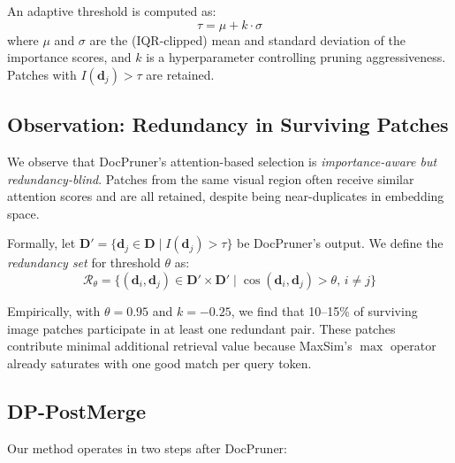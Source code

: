 \documentclass[11pt]{article}
\begin{document}
An adaptive threshold is computed as:
\begin{equation}
\tau = \mu + k \cdot \sigma
\end{equation}
where $\mu$ and $\sigma$ are the (IQR-clipped) mean and standard deviation of the importance scores, and $k$ is a hyperparameter controlling pruning aggressiveness.
Patches with $I(\mathbf{d}_j) > \tau$ are retained.

\subsection{Observation: Redundancy in Surviving Patches}

We observe that DocPruner's attention-based selection is \emph{importance-aware but redundancy-blind}.
Patches from the same visual region often receive similar attention scores and are all retained, despite being near-duplicates in embedding space.

Formally, let $\mathbf{D}' = \{\mathbf{d}_j \in \mathbf{D} \mid I(\mathbf{d}_j) > \tau\}$ be DocPruner's output.
We define the \emph{redundancy set} for threshold $\theta$ as:
\begin{equation}
\mathcal{R}_\theta = \{(\mathbf{d}_i, \mathbf{d}_j) \in \mathbf{D}' \times \mathbf{D}' \mid \cos(\mathbf{d}_i, \mathbf{d}_j) > \theta, \, i \neq j\}
\end{equation}

Empirically, with $\theta = 0.95$ and $k = -0.25$, we find that 10--15\% of surviving image patches participate in at least one redundant pair.
These patches contribute minimal additional retrieval value because MaxSim's $\max$ operator already saturates with one good match per query token.

\subsection{DP-PostMerge}

Our method operates in two steps after DocPruner:
\end{document}
